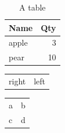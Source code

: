 \begin{table}[htbp]
\caption{\label{tab:org7bfd295}A table}
\centering
\begin{tabular}{lr}
Name & Qty\\
\hline
apple & 3\\
pear & 10\\
\end{tabular}
\end{table}

\begin{center}
\begin{tabular}{rl}
right & left\\
\end{tabular}
\end{center}

\begin{center}
\begin{tabular}{ll}
a & b\\
c & d\\
\end{tabular}
\end{center}
